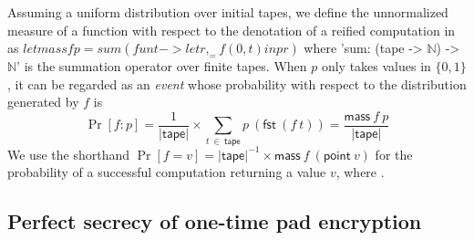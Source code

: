 \documentclass[sigplan,screen]{acmart}\settopmatter{}
\newcommand{\nat}{\mathbb{N}}
\begin{document}
Assuming a uniform distribution over initial tapes, we define the
unnormalized measure of a function \ls{$p$:a -> $\nat$} with respect
to the denotation of a reified computation in  as
\ls$let mass f p = sum (fun t -> let r,_ = f (0, t) in p r)$
where \ls'sum: (tape -> $\nat$) -> $\nat$' is the summation operator over
finite tapes.
%
When $p$ only takes values in $\{0,1\}$, it can be regarded as an
\emph{event} whose probability with respect to the distribution generated by
$f$ is
%
$$
\Pr[ f : p ]
  = \frac{1}{|\mathsf{tape}|} \times \sum_{t\ \in\ \mathsf{tape}} p\ (\mathsf{fst}\ (f\ t))
  = \frac{\mathsf{mass}\ f\ p}{|\mathsf{tape}|}
$$
%
We use the shorthand
%
$\Pr[f = v] = {|\mathsf{tape}|}^{-1} \times \mathsf{mass}\ f\ (\mathsf{point}\ v)$
%
for the probability of a successful computation returning a value $v$,
where
%
.


\subsection{Perfect secrecy of one-time pad encryption}
\end{document}
